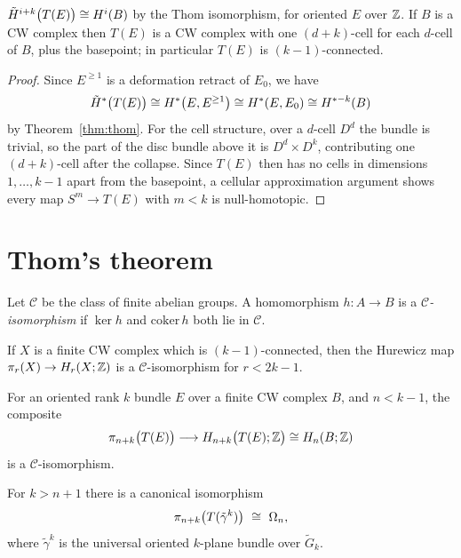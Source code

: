 \begin{proposition}\label{prop:thom-space}
$\tilde H^{i+k}\big(T(E)\big)\cong H^i(B)$ by the Thom isomorphism, for oriented
$E$ over $\mathbb{Z}$. If $B$ is a CW complex then $T(E)$ is a CW complex with one
$(d+k)$-cell for each $d$-cell of $B$, plus the basepoint; in particular
$T(E)$ is $(k-1)$-connected.
\end{proposition}

\begin{proof}
Since $E^{\ge1}$ is a deformation retract of $E_0$, we have
\[
\tilde H^*\big(T(E)\big)\cong H^*\big(E,E^{\ge1}\big)\cong H^*(E,E_0)
\cong H^{*-k}(B)
\]
by Theorem~\ref{thm:thom}. For the cell structure, over a $d$-cell $D^d$ the
bundle is trivial, so the part of the disc bundle above it is
$D^d\times D^k$, contributing one $(d+k)$-cell after the collapse. Since
$T(E)$ then has no cells in dimensions $1,\dots,k-1$ apart from the basepoint, a
cellular approximation argument shows every map $S^m\to T(E)$ with $m<k$ is
null-homotopic.
\end{proof}

\section{Thom's theorem}

\begin{definition}
Let $\mathcal C$ be the class of finite abelian groups. A homomorphism
$h\colon A\to B$ is a \emph{$\mathcal C$-isomorphism} if $\ker h$ and
$\mathrm{coker}\,h$ both lie in $\mathcal C$.
\end{definition}

\begin{theorem}
If $X$ is a finite CW complex which is $(k-1)$-connected, then the Hurewicz map
$\pi_r(X)\to H_r(X;\mathbb{Z})$ is a $\mathcal C$-isomorphism for $r<2k-1$.
\end{theorem}

\begin{corollary}\label{cor:hurewicz-thom}
For an oriented rank $k$ bundle $E$ over a finite CW complex $B$, and $n<k-1$,
the composite
\[
\pi_{n+k}\big(T(E)\big)\longrightarrow H_{n+k}\big(T(E);\mathbb{Z}\big)\cong H_n(B;\mathbb{Z})
\]
is a $\mathcal C$-isomorphism.
\end{corollary}

\begin{theorem}[Thom]\label{thm:thom-cobordism}
For $k>n+1$ there is a canonical isomorphism
\[
\pi_{n+k}\big(T(\tilde\gamma^k)\big)\ \iso\ \Omega_n,
\]
where $\tilde\gamma^k$ is the universal oriented $k$-plane bundle over
$\tilde G_k$.
\end{theorem}

